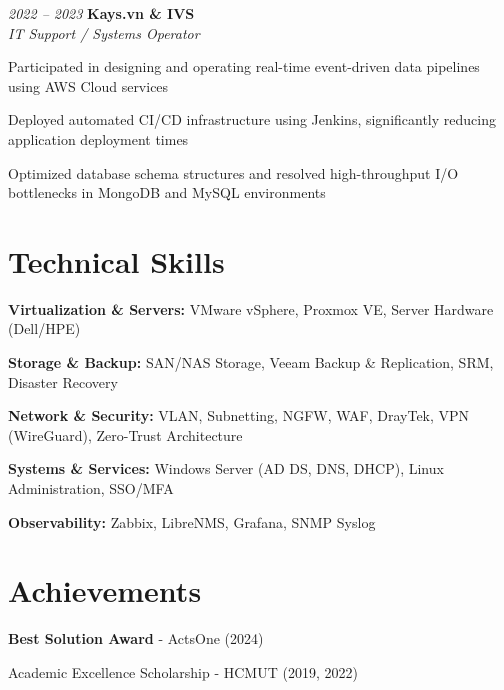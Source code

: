 \begin{twocolentry}{\textit{2022 -- 2023}}
    \textbf{Kays.vn \& IVS} \\[4pt]
    \textit{IT Support / Systems Operator}
\end{twocolentry}
\begin{onecolentry}
    \begin{highlights}
        \item Participated in designing and operating real-time event-driven data pipelines using AWS Cloud services
        \item Deployed automated CI/CD infrastructure using Jenkins, significantly reducing application deployment times
        \item Optimized database schema structures and resolved high-throughput I/O bottlenecks in MongoDB and MySQL environments
    \end{highlights}
\end{onecolentry}

\section{Technical Skills}
\begin{onecolentry}
\begin{highlights}
    \item \textbf{Virtualization \& Servers:} VMware vSphere, Proxmox VE, Server Hardware (Dell/HPE)
    \item \textbf{Storage \& Backup:} SAN/NAS Storage, Veeam Backup \& Replication, SRM, Disaster Recovery
    \item \textbf{Network \& Security:} VLAN, Subnetting, NGFW, WAF, DrayTek, VPN (WireGuard), Zero-Trust Architecture
    \item \textbf{Systems \& Services:} Windows Server (AD DS, DNS, DHCP), Linux Administration, SSO/MFA
    \item \textbf{Observability:} Zabbix, LibreNMS, Grafana, SNMP Syslog
\end{highlights}
\end{onecolentry}

\section{Achievements}
\begin{onecolentry}
    \begin{highlights}
        \item \textbf{Best Solution Award} - ActsOne (2024)
        \item Academic Excellence Scholarship - HCMUT (2019, 2022)
    \end{highlights}
\end{onecolentry}
